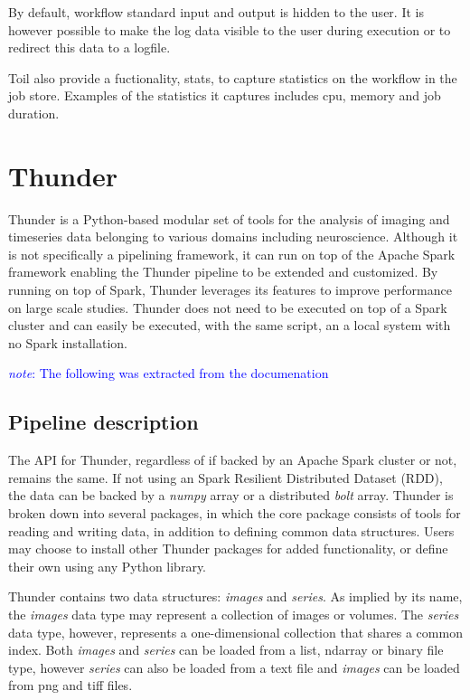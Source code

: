 \documentclass{report}
\newcommand{\note}[1]{\textcolor{blue}{\textit{note}: #1}}
\begin{document}
        By default, workflow standard input and output is hidden to the user.
        It is however possible to make the log data visible to the user during
        execution or to redirect this data to a logfile.

        Toil also provide a fuctionality, stats, to capture statistics on the 
        workflow in the job store. Examples of the statistics it captures
        includes cpu, memory and job duration.

    \section{Thunder}

        Thunder is a Python-based modular set of tools for the analysis of
        imaging and timeseries data belonging to various domains including
        neuroscience. Although it is not specifically a pipelining framework, it
        can run on top of the Apache Spark framework enabling the Thunder
        pipeline to be extended and customized. By running on top of Spark,
        Thunder leverages its features to improve performance on large scale
        studies. Thunder does not need to be executed on top of a Spark cluster
        and can easily be executed, with the same script, an a local system with
        no Spark installation. 

        \note{The following was extracted from the documenation}
        \subsection{Pipeline description} The API for Thunder, regardless of if
        backed by an Apache Spark cluster or not, remains the same. If not using
        an Spark Resilient Distributed Dataset (RDD), the data can be backed by
        a \textit{numpy} array or a distributed \textit{bolt} array. Thunder is
        broken down into several packages, in which the core package consists of
        tools for reading and writing data, in addition to defining common data
        structures. Users may choose to install other Thunder packages for added
        functionality, or define their own using any Python library.        
 

        Thunder contains two data structures: \textit{images} and
        \textit{series}. As implied by its name, the \textit{images} data type
        may represent a collection of images or volumes.  The \textit{series}
        data type, however, represents a one-dimensional collection that shares
        a common index. Both \textit{images} and \textit{series} can be loaded
        from a list, ndarray or binary file type, however \textit{series} can
        also be loaded from a text file and \textit{images} can be loaded from
        png and tiff files.
\end{document}
